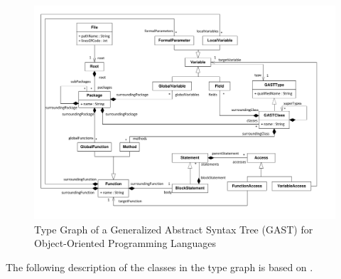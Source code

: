 \begin{figure}[htbp]
  \centering
  \includegraphics[width=\linewidth]{figures/gast-mm}
  \caption{Type Graph of a Generalized Abstract Syntax Tree (GAST) for Object-Oriented Programming Languages \cite{QBench}}
  \label{fig:gast-mm}
\end{figure}

The following description of the classes in the type graph is based on \cite{Tra11}.

